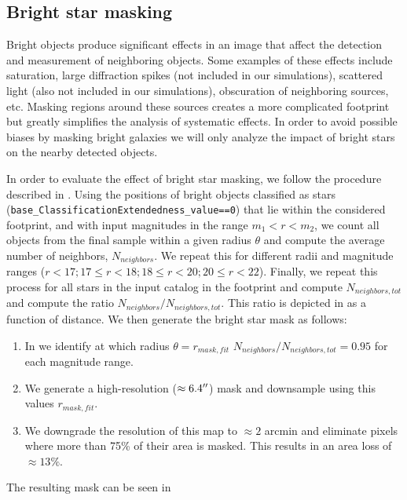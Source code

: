 \documentclass[a4paper,fleqn,usenatbib]{mnras}
\begin{document}
\subsection{Bright star masking}

Bright objects produce significant effects in an image that affect the detection and measurement of neighboring objects. Some examples of these effects include saturation, large diffraction spikes (not included in our simulations), scattered light (also not included in our simulations), obscuration of neighboring sources, etc. Masking regions around these sources creates a more complicated footprint but greatly simplifies the analysis of systematic effects. In order to avoid possible biases by masking bright galaxies we will only analyze the impact of bright stars on the nearby detected objects.

In order to evaluate the effect of bright star masking, we follow the procedure described in \citet{2018PASJ...70S...7C}. Using the positions of bright objects classified as stars (\texttt{base\_ClassificationExtendedness\_value==0}) that lie within the considered footprint, and with input magnitudes in the range $m_{1} < r < m_{2}$, we count all objects from the final sample within a given radius $\theta$ and compute the average number of neighbors, $N_{neighbors}$. We repeat this for different radii and magnitude ranges ($ r < 17; 17 \leq r < 18; 18 \leq r < 20; 20 \leq r < 22$). Finally, we repeat this process for all stars in the input catalog in the footprint and compute $N_{neighbors, tot}$ and compute the ratio $N_{neighbors}/N_{neighbors, tot}$. This ratio is depicted in  as a function of distance. We then generate the bright star mask as follows:
\begin{enumerate}
\item In  we identify at which radius $\theta = r_{mask, fit}$ $N_{neighbors}/N_{neighbors,tot}=0.95$ for each magnitude range.
\item We generate a high-resolution ($\approx 6.4\hbox{$^{\prime\prime}$}$) mask and downsample using this values $r_{mask, fit}$.
\item We downgrade the resolution of this map to $\approx 2$ arcmin and eliminate pixels where more than 75\% of their area is masked. This results in an area loss of $\approx 13\%$. 
\end{enumerate}
The resulting mask can be seen in 
\end{document}
